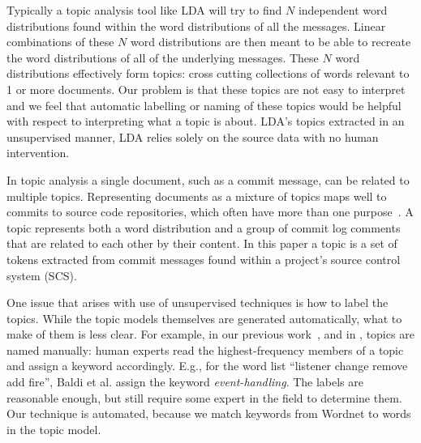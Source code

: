 \documentclass{acm_proc_article-sp}
\begin{document}
Typically a topic analysis tool like LDA will try to find $N$ independent word distributions found within the word distributions of all the messages. Linear combinations of these $N$ word distributions are then meant to be able to recreate the word distributions of all of the underlying messages. These $N$ word distributions effectively form topics: cross cutting collections of words relevant to 1 or more documents. Our problem is that these topics are not easy to interpret and we feel that automatic labelling or naming of these topics would be helpful with respect to interpreting what a topic is about. LDA's topics extracted in an unsupervised manner, LDA relies solely on the source data with no human intervention.

In topic analysis a single document, such as a commit message, can be related to multiple topics. Representing documents as a mixture of topics maps well to commits to source code repositories, which often have more than one purpose~\cite{Hindle09ICSM}.  A topic represents both a word distribution and a group of commit log comments that are related to each other by their content.  In this paper a topic is a set of tokens extracted from commit messages found within a project's source control system (SCS).

\begin{comment}
In this paper we use LDA to identify topics.  LDA works by creating topic models for each period. A topic model is a statistical summary of the important subjects for that dataset.  The input to the algorithm is a set of documents, with contents treated as a bag of words, and a parameter to set the number of topics to generate. The algorithm returns a word-document matrix relating the occurrence frequency of a 
 The idea is similar to other IR approaches like TF/IDF (term frequency/inverse document frequency), which find uncommon words that aren't found in other wordlists. These approaches are unsupervised in that they rely solely on the source data with no human intervention.
\end{comment}

One issue that arises with use of unsupervised techniques is how to label the topics. While the topic models themselves are generated automatically, what to make of them is less clear. For example, in our previous work~\cite{Hindle09ICSM}, and in \cite{Baldi2008}, topics are named manually: human experts read the highest-frequency members of a topic and assign a keyword accordingly. E.g., for the word list ``listener change remove add fire'', Baldi et al. assign the keyword \emph{event-handling}. The labels are reasonable enough, but still require some expert in the field to determine them. Our technique is automated, because we match keywords from Wordnet to words in the topic model. 
\end{document}

